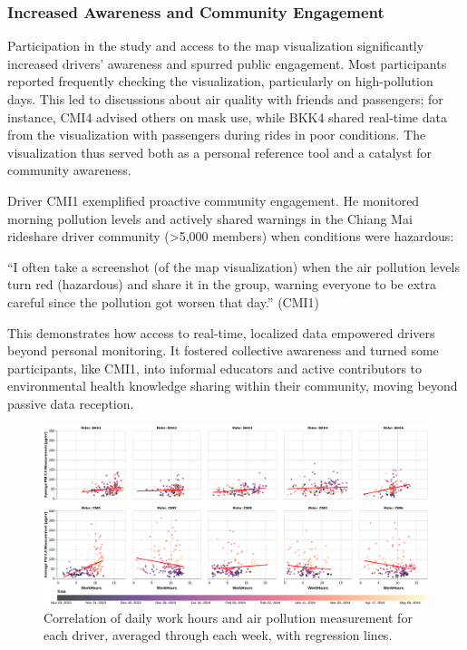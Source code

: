 \documentclass[sigconf,screen,natbib=true]{acmart}
\begin{document}
\subsubsection{Increased Awareness and Community Engagement}
Participation in the study and access to the map visualization significantly increased drivers' awareness and spurred public engagement.
Most participants reported frequently checking the visualization, particularly on high-pollution days.
This led to discussions about air quality with friends and passengers; for instance, CMI4 advised others on mask use, while BKK4 shared real-time data from the visualization with passengers during rides in poor conditions.
The visualization thus served both as a personal reference tool and a catalyst for community awareness.

Driver CMI1 exemplified proactive community engagement.
He monitored morning pollution levels and actively shared warnings in the Chiang Mai rideshare driver community (>5,000 members) when conditions were hazardous:

\begin{quoteb}
 ``I often take a screenshot (of the map visualization) when the air pollution levels turn red (hazardous) and share it in the group, warning everyone to be extra careful since the pollution got worsen that day.'' (CMI1)
\end{quoteb}

This demonstrates how access to real-time, localized data empowered drivers beyond personal monitoring.
It fostered collective awareness and turned some participants, like CMI1, into informal educators and active contributors to environmental health knowledge sharing within their community, moving beyond passive data reception.

\begin{figure}
    \centering
    \includegraphics[width=\textwidth]{figures/work-hours-vs-aqi-per-rider-regression.pdf}
    \caption{Correlation of daily work hours and air pollution measurement for each driver, averaged through each week, with regression lines.
}
    \Description{}
    \label{fig:work-hours-vs-aqi-per-rider}
\end{figure}
\end{document}
